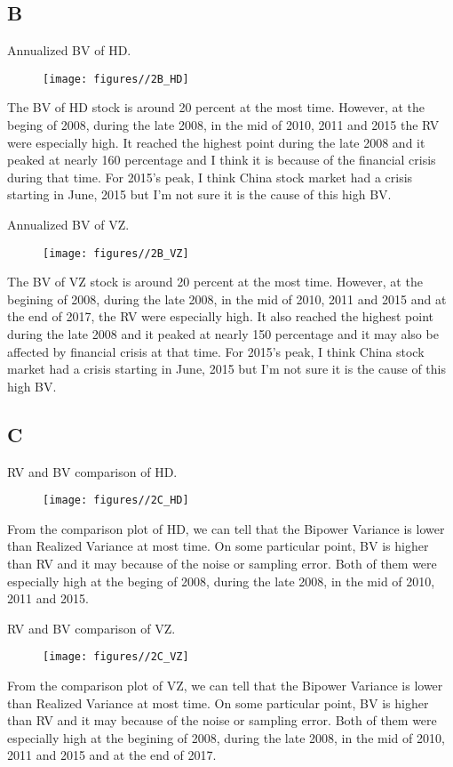 \documentclass{report}
\begin{document}
\subsection{B}
Annualized BV of HD.
\begin{figure}[H]
        \centering 
         \texttt{[image: figures//2B\_HD]}
\end{figure}
The BV of HD stock is around 20 percent at the most time. However, at the beging of 2008, during the late 2008, in the mid of 2010, 2011 and 2015 the RV were especially high. It reached the highest point during the late 2008 and it peaked at nearly 160 percentage and I think it is because of the financial crisis during that time. For 2015's peak, I think China stock market had a crisis starting in June, 2015 but I'm not sure it is the cause of this high BV.

Annualized BV of VZ.
\begin{figure}[H]
        \centering 
         \texttt{[image: figures//2B\_VZ]}
\end{figure}
The BV of VZ stock is around 20 percent at the most time. However, at the begining of 2008, during the late 2008, in the mid of 2010, 2011 and 2015 and at the end of 2017, the RV were especially high. It also reached the highest point during the late 2008 and it peaked at nearly 150 percentage and it may also be affected by financial crisis at that time. For 2015's peak, I think China stock market had a crisis starting in June, 2015 but I'm not sure it is the cause of this high BV.

\subsection{C}
RV and BV comparison of HD.
\begin{figure}[H]
        \centering 
         \texttt{[image: figures//2C\_HD]}
\end{figure}
From the comparison plot of HD, we can tell that the Bipower Variance is lower than Realized Variance at most time. On some particular point, BV is higher than RV and it may because of the noise or sampling error. Both of them were especially high at the beging of 2008, during the late 2008, in the mid of 2010, 2011 and 2015.

RV and BV comparison of VZ.
\begin{figure}[H]
        \centering 
         \texttt{[image: figures//2C\_VZ]}
\end{figure}
From the comparison plot of VZ, we can tell that the Bipower Variance is lower than Realized Variance at most time. On some particular point, BV is higher than RV and it may because of the noise or sampling error. Both of them were especially high  at the begining of 2008, during the late 2008, in the mid of 2010, 2011 and 2015 and at the end of 2017.
\end{document}
